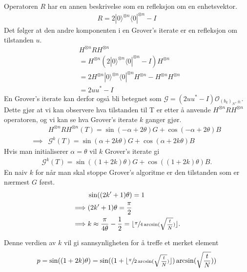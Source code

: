     Operatoren $R$ har en annen beskrivelse som en refleksjon om en enhetsvektor.
    \begin{align*}
        R = 2|0\rangle^{\otimes n}\langle0|^{\otimes n} - I
    \end{align*}
    Det følger at den andre komponenten i en Grover's iterate er en refleksjon om tilstanden $u$.
    \begin{align*}
        & H^{\otimes n}RH^{\otimes n} \\ 
        & = H^{\otimes n}(2|0\rangle^{\otimes n}\langle0|^{\otimes n} -I)H^{\otimes n} \\ 
        & = 2H^{\otimes n}|0\rangle^{\otimes n}\langle0|^{\otimes n}H^{\otimes n} - H^{\otimes n}H^{\otimes n} \\ 
        & = 2uu^* - I
    \end{align*}
    En Grover's iterate kan derfor også bli betegnet som $\mathcal{G}=(2uu^*-I)\mathcal{O}_{(b_k)_N,\pm}$. Dette gjør at vi kan observere hva tilstanden til T er etter å anvende $H^{\otimes n}RH^{\otimes n}$ operatoren, og vi kan se hva Grover's iterate $k$ ganger gjør.
    \begin{align*}
        & H^{\otimes n}RH^{\otimes n}(T)=\sin(-\alpha + 2\theta)G+\cos(-\alpha + 2\theta)B \\
        \implies & \mathcal{G}^k(T)=\sin(\alpha+2k\theta)G+\cos(\alpha+2k\theta)B
    \end{align*} 
    Hvis man initialiserer $\alpha = \theta$ vil $k$ Grover's iterate gi
    \begin{align*}
        \mathcal{G}^k(T)=\sin((1+2k)\theta)G+\cos((1+2k)\theta)B.
    \end{align*}
    En naiv $k$ for når man skal stoppe Grover's algoritme er den tilstanden som er nærmest $G$ først.
    \begin{align*}
        & \sin((2k'+1)\theta) =1 \\
        \implies & (2k'+1)\theta = \frac{\pi}{2} \\
        \implies & k \approx \frac{\pi}{4\theta} - \frac{1}{2}=\lfloor\sfrac{\pi}{4\arcsin(\sqrt{\frac{t}{N}})}\rfloor.
    \end{align*}

    Denne verdien av $k$ vil gi sannsynligheten for å treffe et merket element 
    \begin{align*}
        p = \sin((1+2k)\theta) = \sin((1+\lfloor\sfrac{\pi}{2\arcsin(\sqrt{\frac{t}{N}})}\rfloor)\arcsin(\sqrt{\frac{t}{N}}))
    \end{align*}

